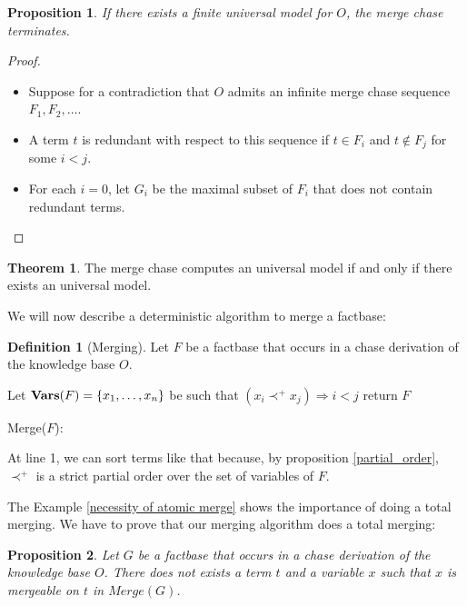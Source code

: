 \documentclass{article}
\newtheorem{proposition}{Proposition}[section]
\theoremstyle{definition}
\newtheorem{definition}{Definition}[section]
\newtheorem{theorem}{Theorem}[section]
\theoremstyle{remark}
\newcommand{\Vars}{\textbf{Vars}}
\newcommand{\Merge}{\textit{Merge}}
\begin{document}
\begin{proposition}
If there exists a finite universal model for $O$, the merge chase terminates.
\end{proposition}

\begin{proof}
\begin{itemize}
\item Suppose for a contradiction that $O$ admits an infinite merge chase sequence $F_1, F_2, \ldots$.
\item A term $t$ is redundant with respect to this sequence if $t \in F_i$ and $t \notin F_j$ for some $i < j$.
\item For each $i = 0$, let $G_i$ be the maximal subset of $F_i$ that does not contain redundant terms.
\end{itemize}
\end{proof}


\begin{theorem}
The merge chase computes an universal model if and only if there exists an universal model.
\end{theorem}

We will now describe a deterministic algorithm to merge a factbase:

\begin{definition}[Merging]
Let $F$ be a factbase that occurs in a chase derivation of the knowledge base $O$.

\begin{algorithm}[H]
\SetAlgoLined


    Let $\textbf{\Vars}(F) = \{x_1,\ldots, x_n\}$ be such that $(x_i \prec^+ x_j) \Rightarrow i < j$ \;
return $F$
\caption{Merge($F$):}


\end{algorithm}
At line 1, we can sort terms like that because, by proposition \ref{partial_order}, $\prec^+$ is a strict partial order over the set of variables of $F$.
\end{definition}

The Example \ref{necessity of atomic merge} shows the importance of doing a total merging. We have to prove that our merging algorithm does a total merging:

\begin{proposition}\label{no_more_siblings}
Let $G$ be a factbase that occurs in a chase derivation of the knowledge base $O$. There does not exists a term $t$ and a variable $x$ such that $x$ is mergeable on $t$ in $\Merge(G)$.
\end{proposition}
\end{document}
